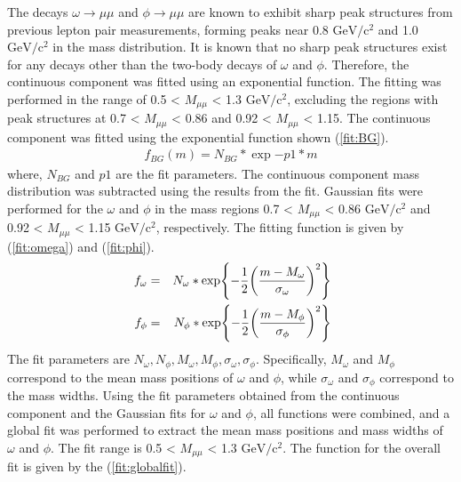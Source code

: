                 The decays \(\omega \rightarrow \mu\mu\) and \(\phi \rightarrow \mu\mu\) are known to exhibit sharp peak structures from previous lepton pair measurements, forming peaks near 0.8 \(\mathrm{GeV/c^2}\) and 1.0 \(\mathrm{GeV/c^2}\) in the mass distribution.
                It is known that no sharp peak structures exist for any decays other than the two-body decays of \(\omega\) and \(\phi\). Therefore, the continuous component was fitted using an exponential function. The fitting was performed in the range of 0.5 < \(M_{\mu\mu}\) < 1.3 \(\mathrm{GeV/c^2}\), excluding the regions with peak structures at 0.7 < \(M_{\mu\mu}\) < 0.86 and 0.92 < \(M_{\mu\mu}\) < 1.15. The continuous component was fitted using the exponential function shown (\ref{fit:BG}).
                \begin{eqnarray}
                    \label{fit:BG}
                    f_{BG}(m)=N_{BG}*\exp{-p1* m}
                \end{eqnarray}
                where, \(N_{BG}\) and \(p1\) are the fit parameters. The continuous component mass distribution was subtracted using the results from the fit. Gaussian fits were performed for the \(\omega\) and \(\phi\) in the mass regions 0.7 < \(M_{\mu\mu}\) < 0.86 \(\mathrm{GeV/c^2}\) and 0.92 < \(M_{\mu\mu}\) < 1.15 \(\mathrm{GeV/c^2}\), respectively. The fitting function is given by (\ref{fit:omega}) and (\ref{fit:phi}).
                \begin{eqnarray}
                    \label{fit:omega}
                    f_{\omega} &=& N_{\omega}*\exp{-\frac{1}{2}\qty(\frac{m-M_{\omega}}{\sigma_{\omega}})^2}\\\
                    \label{fit:phi}
                    f_{\phi} &=& N_{\phi}*\exp{-\frac{1}{2}\qty(\frac{m-M_{\phi}}{\sigma_{\phi}})^2}
                \end{eqnarray}
                The fit parameters are \(N_{\omega}, N_{\phi}, M_{\omega}, M_{\phi}, \sigma_{\omega}, \sigma_{\phi}\). Specifically, \(M_{\omega}\) and \(M_{\phi}\) correspond to the mean mass positions of \(\omega\) and \(\phi\), while \(\sigma_{\omega}\) and \(\sigma_{\phi}\) correspond to the mass widths. Using the fit parameters obtained from the continuous component and the Gaussian fits for \(\omega\) and \(\phi\), all functions were combined, and a global fit was performed to extract the mean mass positions and mass widths of \(\omega\) and \(\phi\). The fit range is 0.5 < \(M_{\mu\mu}\) < 1.3 \(\mathrm{GeV/c^2}\). The function for the overall fit is given by the (\ref{fit:globalfit}).
